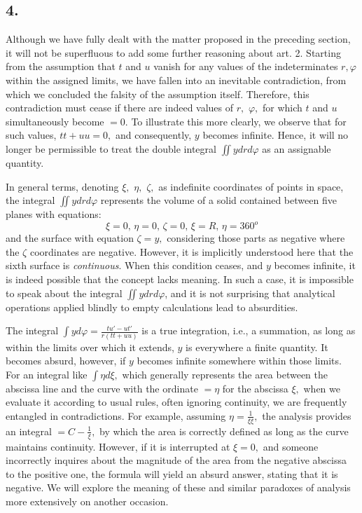 \documentclass[12pt]{memoir}
\theoremstyle{plain}
\theoremstyle{remark}
\begin{document}
\subsection*{4.}

Although we have fully dealt with the matter proposed in the preceding section, it will not be superfluous to add some further reasoning about art. 2. Starting from the assumption that \(t\) and \(u\) vanish for any values of the indeterminates \(r, \varphi\) within the assigned limits, we have fallen into an inevitable contradiction, from which we concluded the falsity of the assumption itself. Therefore, this contradiction must cease if there are indeed values of \(r,\) \(\varphi,\) for which \(t\) and \(u\) simultaneously become \(=0.\) To illustrate this more clearly, we observe that for such values, \(tt+uu=0,\) and consequently, \(y\) becomes infinite. Hence, it will no longer be permissible to treat the double integral \(\iint y drd\varphi\) as an assignable quantity.

In general terms, denoting \(\xi,\) \(\eta,\) \(\zeta,\) as indefinite coordinates of points in space, the integral \(\iint ydrd\varphi\) represents the volume of a solid contained between five planes with equations:
\[ \xi=0\text{, }\eta=0\text{, }\zeta=0\text{, }\xi=R\text{, }\eta=360^o \]
and the surface with equation \(\zeta=y,\) considering those parts as negative where the \(\zeta\) coordinates are negative. However, it is implicitly understood here that the sixth surface is \textit{continuous}. When this condition ceases, and \(y\) becomes infinite, it is indeed possible that the concept lacks meaning. In such a case, it is impossible to speak about the integral \(\iint y drd\varphi\), and it is not surprising that analytical operations applied blindly to empty calculations lead to absurdities.

The integral \(\int y d\varphi = \frac{tu' - ut'}{r(tt + uu)}\) is a true integration, i.e., a summation, as long as within the limits over which it extends, \(y\) is everywhere a finite quantity. It becomes absurd, however, if \(y\) becomes infinite somewhere within those limits. For an integral like \(\int \eta d\xi,\) which generally represents the area between the abscissa line and the curve with the ordinate \(=\eta\) for the abscissa \(\xi,\) when we evaluate it according to usual rules, often ignoring continuity, we are frequently entangled in contradictions. For example, assuming \(\eta = \frac{1}{\xi\xi},\) the analysis provides an integral \(= C - \frac{1}{\xi},\) by which the area is correctly defined as long as the curve maintains continuity. However, if it is interrupted at \(\xi = 0,\) and someone incorrectly inquires about the magnitude of the area from the negative abscissa to the positive one, the formula will yield an absurd answer, stating that it is negative. We will explore the meaning of these and similar paradoxes of analysis more extensively on another occasion.
\end{document}
